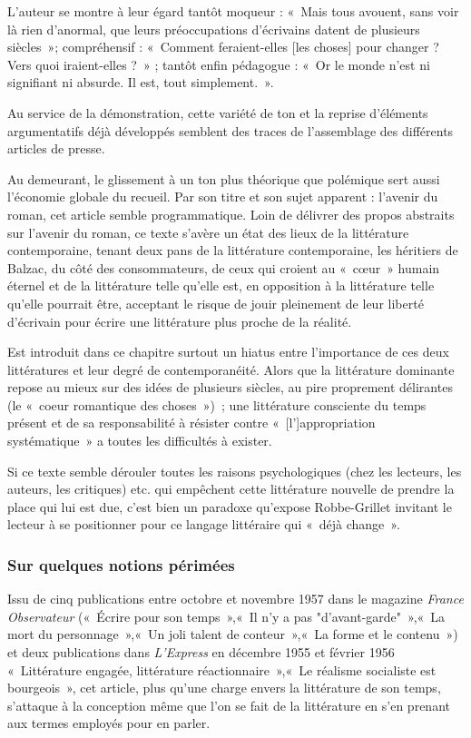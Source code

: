 L'auteur se montre à leur égard tantôt moqueur : «~Mais tous avouent, sans voir là rien d'anormal, que leurs préoccupations d'écrivains datent de plusieurs siècles~»; compréhensif : «~Comment feraient-elles [les choses] pour changer ? Vers quoi iraient-elles ?~» ; tantôt enfin pédagogue : «~Or le monde n'est ni signifiant ni absurde. Il est, tout simplement.~».

Au service de la démonstration, cette variété de ton et la reprise d'éléments argumentatifs déjà développés semblent des traces de l'assemblage des différents articles de presse.

Au demeurant, le glissement à un ton plus théorique que polémique sert aussi l'économie globale du recueil. Par son titre et son sujet apparent : l'avenir du roman, cet article semble programmatique. Loin de délivrer des propos abstraits sur l'avenir du roman, ce texte s'avère un état des lieux de la littérature contemporaine, tenant deux pans de la littérature contemporaine, les héritiers de Balzac, du côté des consommateurs, de ceux qui croient au «~cœur~» humain éternel et de la littérature telle qu'elle est, en opposition à la littérature telle qu'elle pourrait être, acceptant le risque de jouir pleinement de leur liberté d'écrivain pour écrire une littérature plus proche de la réalité.

Est introduit dans ce chapitre surtout un hiatus entre l'importance de ces deux littératures et leur degré de contemporanéité. Alors que la littérature dominante repose au mieux sur des idées de plusieurs siècles, au pire proprement délirantes (le «~coeur romantique des choses~»)~; une littérature consciente du temps présent et de sa responsabilité à résister contre «~[l']appropriation systématique~» a toutes les difficultés à exister.

Si ce texte semble dérouler toutes les raisons psychologiques (chez les lecteurs, les auteurs, les critiques) etc. qui empêchent cette littérature nouvelle de prendre la place qui lui est due, c'est bien un paradoxe qu'expose Robbe-Grillet invitant le lecteur à se positionner pour ce langage littéraire qui «~déjà change~».


\subsubsection{Sur quelques notions périmées}
Issu de cinq publications entre octobre et novembre 1957 dans le magazine \textit{France Observateur} («~Écrire pour son temps~»,«~Il n'y a pas "d'avant-garde"~»,«~La mort du personnage~»,«~Un joli talent de conteur~»,«~La forme et le contenu~») et deux publications dans \textit{L'Express} en décembre 1955 et février 1956 «~Littérature engagée, littérature réactionnaire~»,«~Le réalisme socialiste est bourgeois~», cet article, plus qu'une charge envers la littérature de son temps, s'attaque à la conception même que l'on se fait de la littérature en s'en prenant aux termes employés pour en parler.

